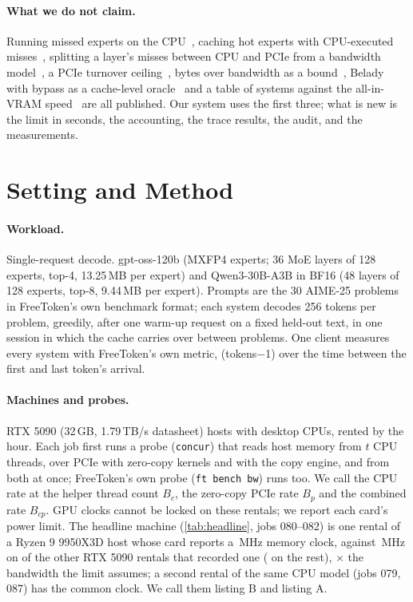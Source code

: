 \documentclass[10pt,twocolumn]{article}
\begin{document}
\paragraph{What we do not claim.} Running missed experts on the CPU~\cite{kamahori2024fiddler,ktransformers},
caching hot experts with CPU-executed misses~\cite{zhong2025hybrimoe,huang2025cpugpu,llamacppdisc24528}, splitting a
layer's misses between CPU and PCIe from a bandwidth model~\cite{freetoken,dali2026}, a PCIe turnover
ceiling~\cite{wisp2026}, bytes over bandwidth as a bound~\cite{budgetingbytes2026}, Belady with bypass as a cache-level
oracle~\cite{zhang2026reproducible} and a table of systems against the all-in-VRAM speed~\cite{wang2026seqmoe} are
all published. Our system uses the first three; what is new is the limit in seconds, the accounting, the trace
results, the audit, and the measurements.



\section{Setting and Method}\label{sec:setting}
\paragraph{Workload.} Single-request decode. gpt-oss-120b (MXFP4 experts; 36 MoE layers of 128 experts, top-4,
13.25\,MB per expert) and Qwen3-30B-A3B in BF16 (48 layers of 128 experts, top-8, 9.44\,MB per expert). Prompts are
the 30 AIME-25 problems in FreeToken's own benchmark format; each system decodes 256 tokens per problem, greedily,
after one warm-up request on a fixed held-out text, in one session in which the cache carries over between problems.
One client measures every system with FreeToken's own metric, (tokens$-$1) over the time between the first and last
token's arrival.

\paragraph{Machines and probes.} RTX 5090 (32\,GB, 1.79\,TB/s datasheet) hosts with desktop CPUs, rented by the hour.
Each job first runs a probe (\texttt{concur}) that reads host memory from $t$ CPU threads, over PCIe with zero-copy
kernels and with the copy engine, and from both at once; FreeToken's own probe (\texttt{ft bench bw}) runs too. We call
the CPU rate at the helper thread count $B_c$, the zero-copy PCIe rate $B_p$ and the combined rate $B_{cp}$. GPU clocks
cannot be locked on these rentals; we report each card's power limit. The headline machine (\cref{tab:headline}, jobs
080--082) is one rental of a Ryzen 9 9950X3D host whose card reports a \memClkHeadline\,MHz memory clock, against
\memClkCommon\,MHz on \memClkCommonN{} of the \memClkOtherRentals{} other RTX 5090 rentals that recorded one
(\memClkOdd{} on the rest), \memClkRatio$\times$ the bandwidth the limit assumes; a second rental of the same CPU
model (jobs 079, 087) has the common clock. We call them listing B and listing A.
\end{document}
